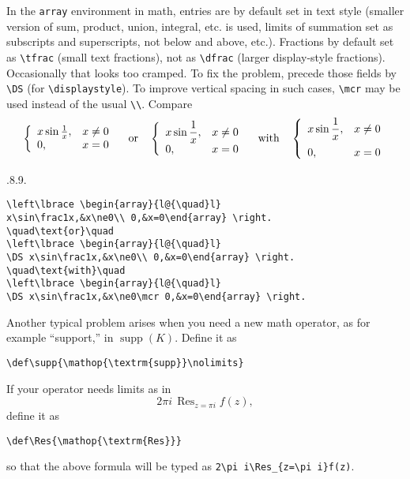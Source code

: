 \documentclass{ics-2015}
\begin{document}
In the \verb+array+ environment in math, entries are by default set in
text style (smaller version of sum, product, union, integral, etc. is used,
limits of summation set as subscripts and superscripts, not below and above, etc.).
Fractions by default set as \verb+\tfrac+ (small text fractions),
not as \verb+\dfrac+ (larger display-style fractions).
Occasionally that looks too cramped.
To fix the problem, precede those fields by \verb+\DS+ (for \verb+\displaystyle+). To improve vertical
spacing in such cases, \verb+\mcr+ may be used instead of the usual
\verb+\\+. Compare
\begin{equation}\label{eq2}
\left\lbrace \begin{array}{l@{\quad}l}
x\sin\frac1x,&x\ne0\\ 0,&x=0\end{array} \right.
\quad\text{or}\quad
\left\lbrace \begin{array}{l@{\quad}l}
\DS x\sin\frac1x,&x\ne0\\ 0,&x=0\end{array} \right.
\quad\text{with}\quad
\left\lbrace \begin{array}{l@{\quad}l}
\DS x\sin\frac1x,&x\ne0\mcr 0,&x=0\end{array} \right.
\end{equation}
{\fs.8.9.\relax
\begin{verbatim}
\left\lbrace \begin{array}{l@{\quad}l}
x\sin\frac1x,&x\ne0\\ 0,&x=0\end{array} \right.
\quad\text{or}\quad
\left\lbrace \begin{array}{l@{\quad}l}
\DS x\sin\frac1x,&x\ne0\\ 0,&x=0\end{array} \right.
\quad\text{with}\quad
\left\lbrace \begin{array}{l@{\quad}l}
\DS x\sin\frac1x,&x\ne0\mcr 0,&x=0\end{array} \right.
\end{verbatim}}

Another typical problem arises when you need a new math
operator, as for example ``support,'' in $\mathop{\textrm{supp}}(K)$.
Define it as
\begin{verbatim}
\def\supp{\mathop{\textrm{supp}}\nolimits}
\end{verbatim}
If your operator needs limits as in
\begin{equation}\label{eq3}
2\pi i\,\mathop{\textrm{Res}}_{z=\pi i} f(z),
\end{equation}
define it as
\begin{verbatim}
\def\Res{\mathop{\textrm{Res}}}
\end{verbatim}
so that the above formula will be typed as \verb+2\pi i\Res_{z=\pi i}f(z)+.
\end{document}
